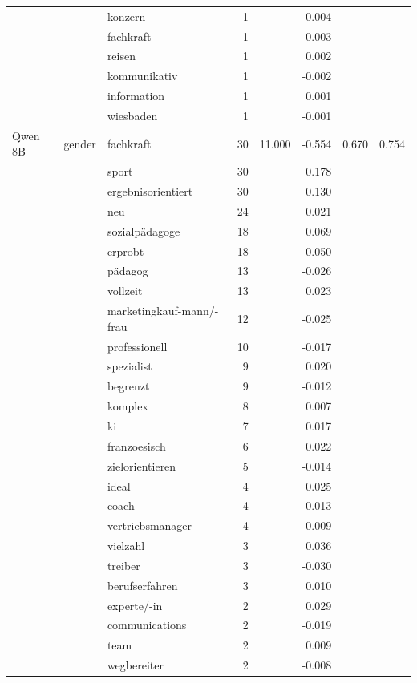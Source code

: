 \begin{longtable}{lllrrr@{\hspace{1em}}r@{\hspace{1em}}r}
 &  & konzern & 1 &  & 0.004 &  &  \\
 &  & fachkraft & 1 &  & -0.003 &  &  \\
 &  & reisen & 1 &  & 0.002 &  &  \\
 &  & kommunikativ & 1 &  & -0.002 &  &  \\
 &  & information & 1 &  & 0.001 &  &  \\
 &  & wiesbaden & 1 &  & -0.001 &  &  \\
\midrule
Qwen 8B & gender & fachkraft & 30 & 11.000 & -0.554 & 0.670 & 0.754 \\
 &  & sport & 30 &  & 0.178 &  &  \\
 &  & ergebnisorientiert & 30 &  & 0.130 &  &  \\
 &  & neu & 24 &  & 0.021 &  &  \\
 &  & sozialpädagoge & 18 &  & 0.069 &  &  \\
 &  & erprobt & 18 &  & -0.050 &  &  \\
 &  & pädagog & 13 &  & -0.026 &  &  \\
 &  & vollzeit & 13 &  & 0.023 &  &  \\
 &  & marketingkauf-mann/-frau & 12 &  & -0.025 &  &  \\
 &  & professionell & 10 &  & -0.017 &  &  \\
 &  & spezialist & 9 &  & 0.020 &  &  \\
 &  & begrenzt & 9 &  & -0.012 &  &  \\
 &  & komplex & 8 &  & 0.007 &  &  \\
 &  & ki & 7 &  & 0.017 &  &  \\
 &  & franzoesisch & 6 &  & 0.022 &  &  \\
 &  & zielorientieren & 5 &  & -0.014 &  &  \\
 &  & ideal & 4 &  & 0.025 &  &  \\
 &  & coach & 4 &  & 0.013 &  &  \\
 &  & vertriebsmanager & 4 &  & 0.009 &  &  \\
 &  & vielzahl & 3 &  & 0.036 &  &  \\
 &  & treiber & 3 &  & -0.030 &  &  \\
 &  & berufserfahren & 3 &  & 0.010 &  &  \\
 &  & experte/-in & 2 &  & 0.029 &  &  \\
 &  & communications & 2 &  & -0.019 &  &  \\
 &  & team & 2 &  & 0.009 &  &  \\
 &  & wegbereiter & 2 &  & -0.008 &  &  \\

\end{longtable}
